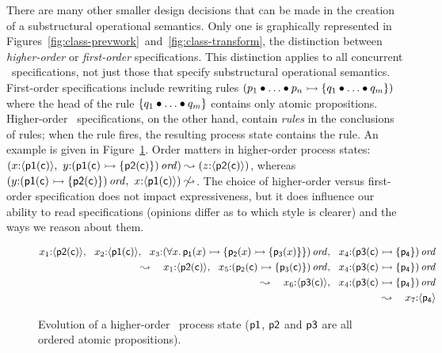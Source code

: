There are many other smaller design decisions that can be made in the
creation of a substructural operational semantics. Only one is
graphically represented in
Figures~\ref{fig:class-prevwork}~and~\ref{fig:class-transform}, the
distinction between {\it higher-order} or {\it first-order}
specifications. This distinction applies to all concurrent
\sls~specifications, not just those that specify substructural
operational semantics. First-order
specifications include rewriting rules $\left( p_1 \mathbin{\bullet} \ldots \mathbin{\bullet}
  p_n \rightarrowtail \{ q_1 \mathbin{\bullet} \ldots \mathbin{\bullet} q_m \} \right)$ where the head
of the rule $\{ q_1 \mathbin{\bullet} \ldots \mathbin{\bullet} q_m \}$ contains only atomic
propositions. Higher-order \sls~specifications, on the other hand,
contain {\it rules} in the conclusions of rules; when the rule fires,
the resulting process state contains the rule. An example is given 
in Figure~\ref{fig:ho-evo-ex}.
Order matters in higher-order process states: $\left(x{:}\langle {\sf p1(c)} \rangle, ~
y{:}{\left( {\sf p1(c)} \rightarrowtail \{ {\sf p2(c)} \} \right)}\,{{\it ord}}\right)
\leadsto \left(z{:}\langle {\sf p2(c)} \rangle\right)$, whereas 
$\left(y{:}{\left( {\sf p1(c)} \rightarrowtail \{ {\sf p2(c)} \} \right)}\,{{\it ord}},~
x{:}\langle {\sf p1(c)} \rangle\right)
\not \leadsto$. 
%
The choice of higher-order versus first-order specification does not
impact expressiveness, but it does influence our ability to read
specifications (opinions differ as to which style is clearer) and 
the ways we reason about them.

\begin{figure}
\begin{align*}
x_1{:}\langle {{\sf p2}({\sf c})} \rangle, ~~
x_2{:}\langle {{\sf p1}({\sf c})} \rangle, ~~
x_3{:}{(\forall x.\,{\sf p_1}(x) 
                \rightarrowtail \{ {\sf p_2}(x) \rightarrowtail \{ {\sf p_3}(x) \} \})}\,{{\it ord}}, ~~
x_4{:}{({\sf p3}({\sf c}) \rightarrowtail \{ {\sf p_4} \})}\,{{\it ord}} & \\
\leadsto ~~~ 
x_1{:}\langle {{\sf p2}({\sf c})} \rangle, ~~
x_5{:}{({\sf p_2}({\sf c}) \rightarrowtail \{ {\sf p_3}({\sf c}) \})}\,{{\it ord}}, ~~
x_4{:}{({\sf p3}({\sf c}) \rightarrowtail \{ {\sf p_4} \})}\,{{\it ord}} & \\
\leadsto ~~~ 
x_6{:}\langle {{\sf p3}({\sf c})} \rangle, ~~
x_4{:}{({\sf p3}({\sf c}) \rightarrowtail \{ {\sf p_4} \})}\,{{\it ord}} & \\
\leadsto ~~~ 
x_7{:}\langle {{\sf p_4}} \rangle & 
\end{align*}
\caption{Evolution of a higher-order \sls~process state (${\sf p1}$, ${\sf
  p2}$ and ${\sf p3}$ are all ordered atomic propositions).}
\label{fig:ho-evo-ex}
\end{figure}

